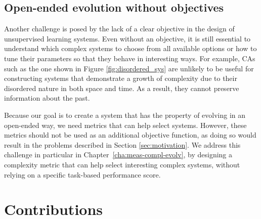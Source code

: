 \subsection{Open-ended evolution without
  objectives}\label{sec:open-ended-evolution}

Another challenge is posed by the lack of a clear objective in the design of
unsupervised learning systems. Even without an objective, it is still essential
to understand which complex systems to choose from all available options or how
to tune their parameters so that they behave in interesting ways. For example,
\acp{CA} such as the one shown in Figure \ref{fig:disordered_sys} are unlikely 
to be useful for constructing systems that demonstrate a growth of complexity 
due to their disordered nature in both space and time. As a result, they cannot
preserve information about the past.

Because our goal is to create a system that has the property of evolving in an
open-ended way, we need metrics that can help select systems. However, these metrics 
should not be used as an additional objective function, as doing so would result 
in the problems described in Section \ref{sec:motivation}. We address this 
challenge in particular
in Chapter~\ref{cha:meas-compl-evolv}, by designing a complexity metric that can
help select interesting complex systems, without relying on a specific
task-based performance score.

\section{Contributions}


